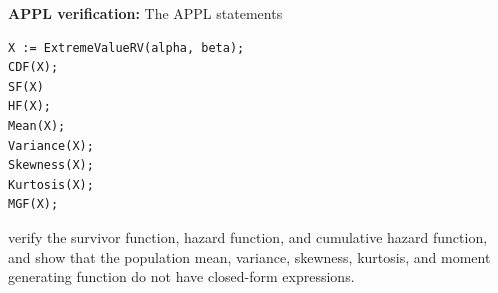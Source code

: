 \documentclass[12pt,fullpage]{article}
\begin{document}
\vspace{0.05in}

\newpage
\noindent
{\bf APPL verification:}
The APPL statements
\begin{verbatim}
X := ExtremeValueRV(alpha, beta);
CDF(X);
SF(X)
HF(X);
Mean(X);
Variance(X);
Skewness(X);
Kurtosis(X);
MGF(X);
\end{verbatim}
verify the survivor function, hazard function, and cumulative hazard function, and show that the population mean, variance, skewness, kurtosis, and moment generating function
do not have closed-form expressions.
\end{document}
